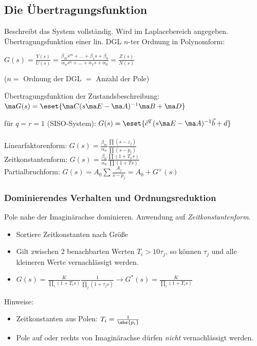 \documentclass[german]{latex4ei/latex4ei_sheet}
\begin{document}
\begin{sectionbox}
	\subsection{Die Übertragungsfunktion}
	Beschreibt das System vollständig. Wird im Laplacebereich angegeben.\\
	Übertragungsfunktion einer lin. DGL $n$-ter Ordnung in Polynomform:\\
	\begin{emphbox} $\displaystyle G(s) = \frac{Y(s)}{U(s)} = \frac{\beta_m s^m + \ldots + \beta_1 s + \beta_0}{\alpha_n s^n + \ldots + \alpha_1 s + \alpha _0} = \frac{Z(s)}{N(s)}$ \end{emphbox}
	($n =$ Ordnung der DGL $=$ Anzahl der Pole)\\
	\begin{emphbox}Übertragungsfunktion der Zustandsbeschreibung: \\$\ma G (s) = \eset{\ma C (s \ma E - \ma A)^{-1} \ma B + \ma D}$\end{emphbox}
	für $q = r = 1$ (SISO-System):
	$G(s) = \eset{ \vec c^{T} (s \ma E - \ma A)^{-1} \vec b + d}$\\
	\\
	Linearfaktorenform: $G(s) = \frac{\beta_m}{\alpha_n} \frac{\prod (s-z_j)}{\prod (s-p_i)}$\\
	Zeitkonstantenform: $G(s) = \frac{\beta_0}{\alpha_0} \frac{\prod (1+T_v s)}{\prod (1+T s)}$\\
	Partialbruchform: $G(s) = A_0 \sum \frac{A_j}{s-p_j} = A_0 + G^+(s)$\\

	\subsubsection{Dominierendes Verhalten und Ordnungsreduktion}
	Pole nahe der Imaginärachse dominieren. Anwendung auf \emph{Zeitkonstantenform}.
	\begin{itemize}
		\item Sortiere Zeitkonstanten nach Größe
		\item Gilt zwischen 2 benachbarten Werten $T_i > 10 \tau_j$, so können $\tau_j$ und alle kleineren Werte vernachlässigt werden.
		\item $G(s) = \frac{K}{\prod\limits_{i}{(1 + T_i s)}} \frac{1}{\prod\limits_{j}{(1 + \tau_j s)}} \rightarrow G^*(s) = \frac{K}{\prod\limits_{i}{(1 + T_i s)}}$
	\end{itemize}
	Hinweise:
	\begin{itemize}
		\item Zeitkonstanten aus Polen: $T_i = \frac{1}{\abs{p_i}}$
		\item Pole auf oder rechts von Imaginärachse dürfen \emph{nicht} vernachlässigt werden.
	\end{itemize}


\end{sectionbox}
\end{document}
